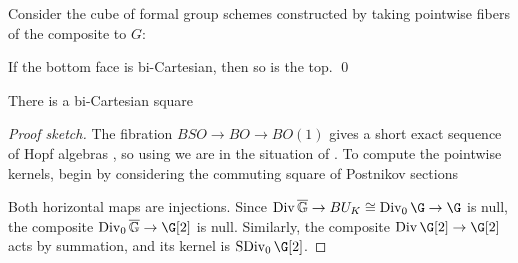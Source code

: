\begin{lemma}\label{CubeOfFibers}
Consider the cube of formal group schemes constructed by taking pointwise fibers of the composite to $G$:
\begin{center}
\end{center}
If the bottom face is bi-Cartesian, then so is the top. \qed
\end{lemma}

\begin{corollary}\label{BSpinAnalysis}
There is a bi-Cartesian square
\begin{center}
\end{center}
\end{corollary}
\begin{proof}[Proof sketch]
The fibration $BSO \to BO \to BO(1)$ gives a short exact sequence of Hopf algebras , so using  we are in the situation of .  To compute the pointwise kernels, begin by considering the commuting square of Postnikov sections
\begin{center}
\end{center}
 Both horizontal maps are injections.  Since $\Div \barG \to BU_K \cong \Div_0 \G \to \G$ is null, the composite $\Div_0 \barG \to \G[2]$ is null.  Similarly, the composite $\Div \G[2] \to \G[2]$ acts by summation, and its kernel is $\SDiv_0 \G[2]$.
\end{proof}

